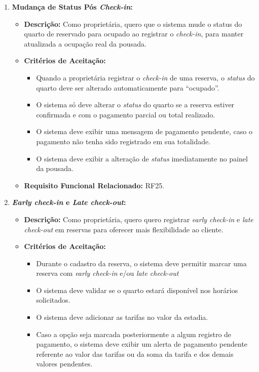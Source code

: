 \documentclass[
	12pt,				%
	openany,			%
	twoside,			%
	a4paper,			%
	english,			%
	french,				%
	spanish,			%
	brazil				%
	]{abntex2}
\begin{document}
\begin{enumerate}[label=\textbf{\arabic*.}]
\begin{itemize}
	 \end{itemize} 
	  \item \textbf{Mudança de Status Pós \textit{Check-in}:}
	 \begin{itemize}
	 	\item \textbf{Descrição:} Como proprietária, quero que o sistema mude o status do quarto de reservado para ocupado ao registrar o \textit{check-in}, para manter atualizada a ocupação real da pousada.
	 	\item \textbf{Critérios de Aceitação:}
	 	\begin{itemize}
	 		\item Quando a proprietária registrar o \textit{check-in} de uma reserva, o \textit{status} do quarto deve ser alterado automaticamente para “ocupado”.
	 		\item O sistema só deve alterar o \textit{status} do quarto se a reserva estiver confirmada e com o pagamento parcial ou total realizado.
	 		\item O sistema deve exibir uma mensagem de pagamento pendente, caso o pagamento não tenha sido registrado em sua totalidade.
	 		\item O sistema deve exibir a alteração de \textit{status} imediatamente no painel da pousada.
	 	\end{itemize}
	 	\item \textbf{Requisito Funcional Relacionado:} RF25.
	 \end{itemize} 
	  \item \textbf{\textit{Early check-in} e \textit{Late check-out}:}
	 \begin{itemize}
	 	\item \textbf{Descrição:}  Como proprietária, quero quero registrar \textit{early check-in} e \textit{late check-out} em reservas para oferecer mais flexibilidade ao cliente.
	 	\item \textbf{Critérios de Aceitação:}
	 	\begin{itemize}
	 		\item Durante o cadastro da reserva, o sistema deve permitir marcar uma reserva com \textit{early check-in} e/ou \textit{late check-out}
	 		\item O sistema deve validar se o quarto estará disponível nos horários solicitados.
	 		\item O sistema deve adicionar as tarifas no valor da estadia.
	 		\item Caso a opção seja marcada posteriormente a algum registro de pagamento, o sistema deve exibir um alerta de pagamento pendente referente ao valor das tarifas ou da soma da tarifa e dos demais valores pendentes.

\end{itemize}
\end{itemize}
\end{enumerate}
\end{document}
